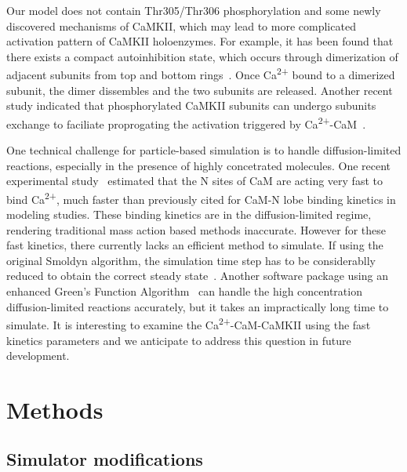 \documentclass[10pt,letterpaper]{article}
\begin{document}
Our model does not contain Thr305/Thr306 phosphorylation and some newly discovered mechanisms of CaMKII, which may lead to more complicated activation pattern of CaMKII holoenzymes. For example, it has been found that there exists a compact autoinhibition state, which occurs through dimerization of adjacent subunits from top and bottom rings~\cite{Chao:2010fn}. Once Ca\textsuperscript{2+} bound to a dimerized subunit, the dimer dissembles and the two subunits are released. Another recent study indicated that phosphorylated CaMKII subunits can undergo subunits exchange to faciliate proprogating the activation triggered by Ca\textsuperscript{2+}-CaM~\cite{Stratton:2014ct}.

One technical challenge for particle-based simulation is to handle diffusion-limited reactions, especially in the presence of highly concetrated molecules. One recent experimental study~\cite{Faas:2011fna} estimated that the N sites of CaM are acting very fast to bind Ca\textsuperscript{2+}, much faster than previously cited for CaM-N lobe binding kinetics in modeling studies. These binding kinetics are in the diffusion-limited regime, rendering traditional mass action based methods inaccurate. However for these fast kinetics, there currently lacks an efficient method to simulate. If using the original Smoldyn algorithm, the simulation time step has to be considerablly reduced to obtain the correct steady state~\cite{Andrews:2015}. Another software package using an enhanced Green's Function Algorithm~\cite{vanZon:2005jd} can handle the high concentration diffusion-limited reactions accurately, but it takes an impractically long time to simulate. It is interesting to examine the Ca\textsuperscript{2+}-CaM-CaMKII using the fast kinetics parameters and we anticipate to address this question in future development.

\section*{Methods}
\subsection*{Simulator modifications}
\end{document}
